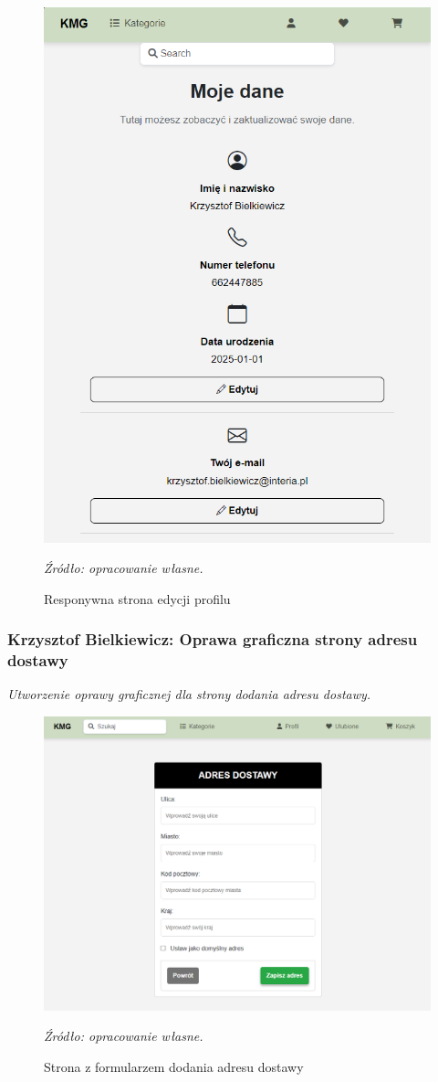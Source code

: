\documentclass[12pt,a4paper,oneside]{article}
\theoremstyle{definition}
\numberwithin{equation}{section}
\begin{document}
\begin{figure}[H]
    \centering
    \includegraphics[width=0.5\columnwidth]{images/krzysztofBImages/profil/responywna-strona-profilu.png}
    \caption{Responywna strona edycji profilu}
    \emph{Źródło: opracowanie własne.}
\end{figure}

\subsubsection{Krzysztof Bielkiewicz: Oprawa graficzna strony adresu dostawy}
\label{1.3.7}
\textit{Utworzenie oprawy graficznej dla strony dodania adresu dostawy.}
\begin{figure}[H]
    \centering
    \includegraphics[width=0.8\columnwidth]{images/krzysztofBImages/strona-dodaj-adres.png}
    \caption{Strona z formularzem dodania adresu dostawy}
    \emph{Źródło: opracowanie własne.}
\end{figure}
\end{document}
